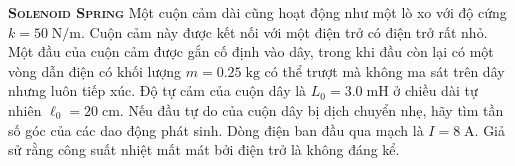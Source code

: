 
\begin{problem}{\textbf{\textsc{Solenoid Spring}}\hspace{1mm}}
	Một cuộn cảm dài cũng hoạt động như một lò xo với độ cứng $k=50\;\mathrm{N/m}$. Cuộn cảm này được kết nối với một điện trở có điện trở rất nhỏ. Một đầu của cuộn cảm được gắn cố định vào dây, trong khi đầu còn lại có một vòng dẫn điện có khối lượng $m=0.25\;\mathrm{kg}$ có thể trượt mà không ma sát trên dây nhưng luôn tiếp xúc. Độ tự cảm của cuộn dây là $L_0=3.0\;\mathrm{mH}$ ở chiều dài tự nhiên $\ell_0=20\;\mathrm{cm}$. Nếu đầu tự do của cuộn dây bị dịch chuyển nhẹ, hãy tìm tần số góc của các dao động phát sinh. Dòng điện ban đầu qua mạch là $I=8\;\mathrm{A}$. Giả sử rằng công suất nhiệt mất mát bởi điện trở là không đáng kể.    
\end{problem}